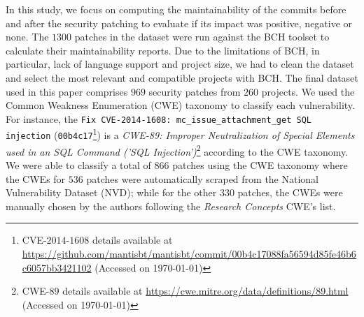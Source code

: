 \documentclass[smallextended]{svjour3}       %
\begin{document}
In this study, we focus on computing the maintainability of the 
commits before and after the security patching to evaluate if its 
impact was positive, negative or none. The $1300$ patches in the 
dataset were run against the BCH toolset to calculate their 
maintainability reports. Due to the limitations of BCH, in particular, 
lack of language support and project size, we had
to clean the dataset and select the most relevant and compatible projects
with BCH. The final dataset used in this 
paper comprises $969$ security patches from $260$ projects. We used the 
Common Weakness Enumeration (CWE) taxonomy to classify each vulnerability. For instance,  the \texttt{Fix CVE-2014-1608: mc\_issue\_attachment\_get SQL injection} (\texttt{00b4c17}\footnote{CVE-$2014$-$1608$ details available at \url{https://github.com/mantisbt/mantisbt/commit/00b4c17088fa56594d85fe46b6c6057bb3421102} (Accessed on \today)}) is a \emph{CWE-89: Improper Neutralization of Special Elements used in an SQL Command ('SQL Injection')}\footnote{CWE-$89$ details available at \url{https://cwe.mitre.org/data/definitions/89.html} (Accessed on \today)} according to the CWE taxonomy.
We were able to classify a total of $866$ patches using the CWE taxonomy
where the CWEs for $536$ patches were automatically scraped from the National Vulnerability Dataset (NVD); while for the other $330$ patches, the CWEs were manually chosen by the authors following the \emph{Research Concepts} CWE's list.

\end{document}
